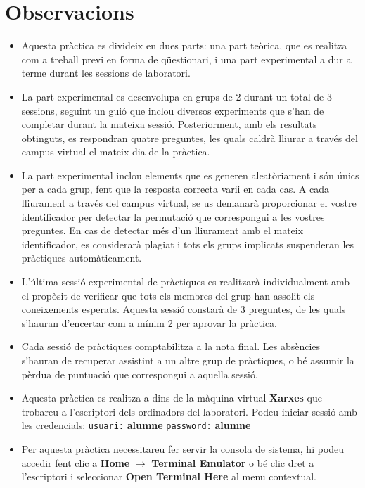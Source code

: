 \documentclass[12pt,a4paper]{article}
\begin{document}
\section*{Observacions}

 \begin{itemize}
 \item Aquesta pràctica es divideix en dues parts: una part teòrica, que es realitza com a treball previ en forma de qüestionari, i una part experimental a dur a terme durant les sessions de laboratori.
 \item La part experimental es desenvolupa en grups de 2 durant un total de 3 sessions, seguint un guió que inclou diversos experiments que s'han de completar durant la mateixa sessió. Posteriorment, amb els resultats obtinguts, es respondran quatre preguntes, les quals caldrà lliurar a través del campus virtual el mateix dia de la pràctica.
\item La part experimental inclou elements que es generen aleatòriament i són únics per a cada grup, fent que la resposta correcta varii en cada cas. A cada lliurament a través del campus virtual, se us demanarà proporcionar el vostre identificador per detectar la permutació que correspongui a les vostres preguntes. En cas de detectar més d'un lliurament amb el mateix identificador, es considerarà plagiat i tots els grups implicats suspenderan les pràctiques automàticament.
\item L'última sessió experimental de pràctiques es realitzarà individualment amb el propòsit de verificar que tots els membres del grup han assolit els coneixements esperats. Aquesta sessió constarà de 3 preguntes, de les quals s'hauran d'encertar com a mínim 2 per aprovar la pràctica.
\item Cada sessió de pràctiques comptabilitza a la nota final. Les absències s'hauran de recuperar assistint a un altre grup de pràctiques, o bé assumir la pèrdua de puntuació que correspongui a aquella sessió.
 \item Aquesta pràctica es realitza a dins de la màquina virtual \textbf{Xarxes} que trobareu a l'escriptori dels ordinadors del laboratori. Podeu iniciar sessió amb les credencials:
   \newline \texttt{usuari:} \textbf{alumne}
   \newline \texttt{password:} \textbf{alumne}
 \item Per aquesta pràctica necessitareu fer servir la consola de sistema, hi podeu accedir fent clic a \textbf{Home} $\rightarrow$ \textbf{Terminal Emulator} o bé clic dret a l'escriptori i seleccionar \textbf{Open Terminal Here} al menu contextual.
 

\end{itemize}
\end{document}
